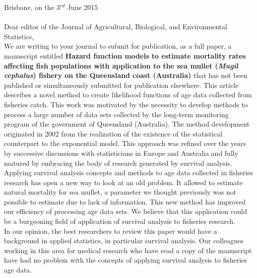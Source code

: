 \documentclass[11pt]{article}
\begin{document}
\begin{spacing}{1.2} 
\hspace{9cm} Brisbane, on the 3$^{rd}$ June 2015\\ \\

\noindent Dear editor of the Journal of Agricultural, Biological, and Environmental Statistics, \\

\noindent We are writing to your journal to submit for publication, as a full paper, a manuscript entitled {\bf Hazard function models to estimate mortality rates affecting fish populations with application to the sea mullet ({\it Mugil cephalus}) fishery on the Queensland coast (Australia)} that has not been published or simultaneously submitted for publication elsewhere. This article describes a novel method to create likelihood functions of age data collected from fisheries catch. This work was motivated by the necessity to develop methods to process a large number of data sets collected by the long-term monitoring program of the government of Queensland (Australia). The method development originated in 2002 from the realization of the existence of the statistical counterpart to the exponential model. This approach was refined over the years by successive discussions with statisticians in Europe and Australia and fully matured by embracing the body of research generated by survival analysis. \\

Applying survival analysis concepts and methods to age data collected in fisheries research has open a new way to look at an old problem. It allowed to estimate natural mortality for sea mullet, a parameter we thought previously was not possible to estimate due to lack of information. This new method has improved our efficiency of processing age data sets. We believe that this application could be a burgeoning field of application of survival analysis to fisheries research. \\%

In our opinion, the best researchers to review this paper would have a background in applied statistics, in particular survival analysis. Our colleagues working in this area for medical research who have read a copy of the manuscript have had no problem with the concepts of applying survival analysis to fisheries age data. \\%


\end{spacing}
\end{document}
